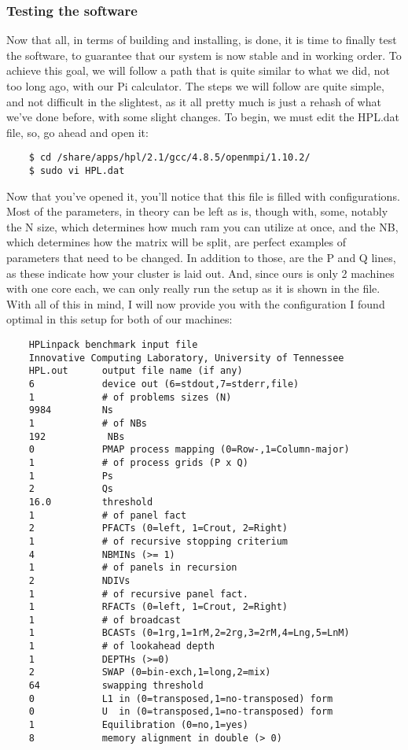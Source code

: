 \documentclass[]{article}
\begin{document}
    \subsubsection{Testing the software}
    Now that all, in terms of building and installing, is done, it is time to finally test the software, to 
    guarantee that our system is now stable and in working order. To achieve this goal, we will follow a path 
    that is quite similar to what we did, not too long ago, with our Pi calculator. The steps we will follow 
    are quite simple, and not difficult in the slightest, as it all pretty much is just a rehash of what we've 
    done before, with some slight changes. To begin, we must edit the HPL.dat file, so, go ahead and open it:
    \begin{lstlisting}
    $ cd /share/apps/hpl/2.1/gcc/4.8.5/openmpi/1.10.2/
    $ sudo vi HPL.dat
    \end{lstlisting}
    Now that you've opened it, you'll notice that this file is filled with configurations. Most of the 
    parameters, in theory can be left as is, though with, some, notably the N size, which determines how much 
    ram you can utilize at once, and the NB, which determines how the matrix will be split, are perfect 
    examples of parameters that need to be changed. In addition to those, are the P and Q lines, as these 
    indicate how your cluster is laid out. And, since ours is only 2 machines with one core each, we can only 
    really run the setup as it is shown in the file. With all of this in mind, I will now provide you with the configuration I found optimal in this setup for both of our machines:
    \begin{lstlisting}
    HPLinpack benchmark input file
    Innovative Computing Laboratory, University of Tennessee
    HPL.out      output file name (if any) 
    6            device out (6=stdout,7=stderr,file)
    1            # of problems sizes (N)
    9984         Ns
    1            # of NBs
    192           NBs
    0            PMAP process mapping (0=Row-,1=Column-major)
    1            # of process grids (P x Q)
    1            Ps
    2            Qs
    16.0         threshold
    1            # of panel fact
    2            PFACTs (0=left, 1=Crout, 2=Right)
    1            # of recursive stopping criterium
    4            NBMINs (>= 1)
    1            # of panels in recursion
    2            NDIVs
    1            # of recursive panel fact.
    1            RFACTs (0=left, 1=Crout, 2=Right)
    1            # of broadcast
    1            BCASTs (0=1rg,1=1rM,2=2rg,3=2rM,4=Lng,5=LnM)
    1            # of lookahead depth
    1            DEPTHs (>=0)
    2            SWAP (0=bin-exch,1=long,2=mix)
    64           swapping threshold
    0            L1 in (0=transposed,1=no-transposed) form
    0            U  in (0=transposed,1=no-transposed) form
    1            Equilibration (0=no,1=yes)
    8            memory alignment in double (> 0)
    \end{lstlisting}
\end{document}

